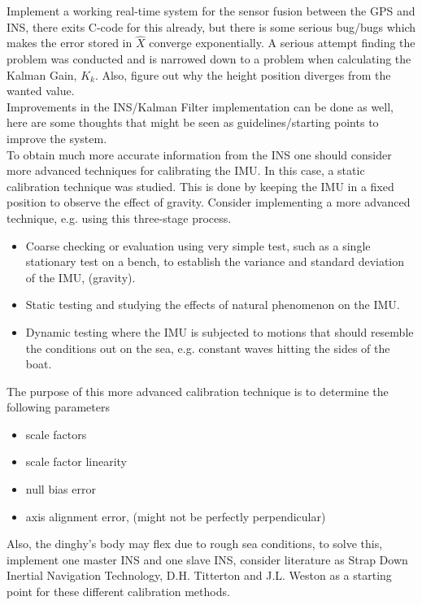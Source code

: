 Implement a working real-time system for the sensor fusion between the GPS and INS, there exits C-code for this already, but there is some serious bug/bugs which makes the error stored in $\hat{X}$ converge exponentially. A serious attempt finding the problem was conducted and is narrowed down to a problem when calculating the Kalman Gain, $K_k$. Also, figure out why the height position diverges from the wanted value.\\

Improvements in the INS/Kalman Filter implementation can be done as well, here are some thoughts that might be seen as guidelines/starting points to improve the system. \\
To obtain much more accurate information from the INS one should consider more advanced techniques for calibrating the IMU. In this case, a static calibration technique was studied. This is done by keeping the IMU in a fixed position to observe the effect of gravity.
Consider implementing a more advanced technique, e.g. using this three-stage process.
\begin{itemize}
\item Coarse checking or evaluation using very simple test, such as a single stationary test on a bench, to establish the variance and standard deviation of the IMU, (gravity).
\item Static testing and studying the effects of natural phenomenon on the IMU.
\item Dynamic testing where the IMU is subjected to motions that should resemble the conditions out on the sea, e.g. constant waves hitting the sides of the boat. 
\end{itemize}
The purpose of this more advanced calibration technique is to determine the following parameters \cite{non-linear}
\begin{itemize}
\item scale factors
\item scale factor linearity
\item null bias error
\item axis alignment error, (might not be perfectly perpendicular)
\end{itemize}
Also, the dinghy's body may flex due to rough sea conditions, to solve this, implement one master INS and one slave INS, consider literature as Strap Down Inertial Navigation Technology, D.H. Titterton and J.L. Weston as a starting point for these different calibration methods. \newline 

